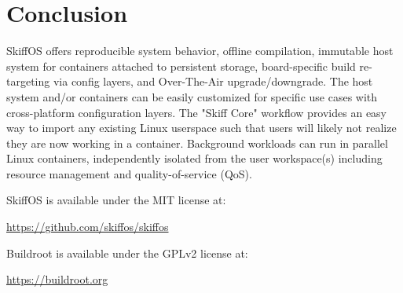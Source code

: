 \documentclass[english,]{IEEEtran}
\begin{document}
\hypertarget{conclusion}{%
\section{Conclusion}\label{conclusion}}

SkiffOS offers reproducible system behavior, offline compilation,
immutable host system for containers attached to persistent storage,
board-specific build re-targeting via config layers, and Over-The-Air
upgrade/downgrade. The host system and/or containers can be easily
customized for specific use cases with cross-platform configuration
layers. The "Skiff Core" workflow provides an easy way to import any
existing Linux userspace such that users will likely not realize they
are now working in a container. Background workloads can run in parallel
Linux containers, independently isolated from the user workspace(s)
including resource management and quality-of-service (QoS).

SkiffOS is available under the MIT license at:

\url{https://github.com/skiffos/skiffos}

Buildroot is available under the GPLv2 license at:

\url{https://buildroot.org}

\clearpage

\printbibliography
\end{document}
